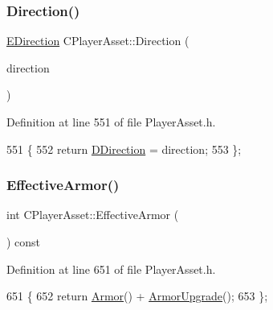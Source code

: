 \subsubsection{\texorpdfstring{Direction()}{Direction()}\hspace{0.1cm}{\footnotesize\ttfamily [2/2]}}
{\footnotesize\ttfamily \hyperlink{GameDataTypes_8h_acb2b033915f6659a71a38b5aa6e4eb42}{E\+Direction} C\+Player\+Asset\+::\+Direction (\begin{DoxyParamCaption}\item[{\hyperlink{GameDataTypes_8h_acb2b033915f6659a71a38b5aa6e4eb42}{E\+Direction}}]{direction }\end{DoxyParamCaption})\hspace{0.3cm}{\ttfamily [inline]}}



Definition at line 551 of file Player\+Asset.\+h.


\begin{DoxyCode}
551                                                   \{
552             \textcolor{keywordflow}{return} \hyperlink{classCPlayerAsset_a2f07e280268d0402220c583d1029d683}{DDirection} = direction;
553         \};
\end{DoxyCode}
\hypertarget{classCPlayerAsset_a1bceaff561a420eaa8924eeb421fd594}{}\label{classCPlayerAsset_a1bceaff561a420eaa8924eeb421fd594} 
\subsubsection{\texorpdfstring{Effective\+Armor()}{EffectiveArmor()}}
{\footnotesize\ttfamily int C\+Player\+Asset\+::\+Effective\+Armor (\begin{DoxyParamCaption}{ }\end{DoxyParamCaption}) const\hspace{0.3cm}{\ttfamily [inline]}}



Definition at line 651 of file Player\+Asset.\+h.


\begin{DoxyCode}
651                                   \{
652             \textcolor{keywordflow}{return} \hyperlink{classCPlayerAsset_a3de4826a7d7e8d2c5fd325ec736567ab}{Armor}() + \hyperlink{classCPlayerAsset_a1312cb77efe2cf732cc255a8345e7c44}{ArmorUpgrade}();
653         \};
\end{DoxyCode}
\hypertarget{classCPlayerAsset_a13b40b2b670c86fb2d1f319837eca2da}{}\label{classCPlayerAsset_a13b40b2b670c86fb2d1f319837eca2da} 
